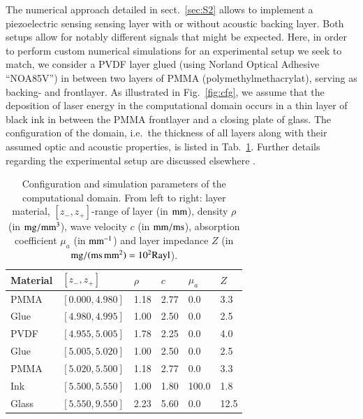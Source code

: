 \documentclass[5p,times,twocolumn]{elsarticle}
\begin{document}
The numerical approach detailed in sect.\ \ref{sec:S2} allows to implement a
piezoelectric sensing sensing layer with or without acoustic backing layer.
Both setups allow for notably different signals that might be expected.  Here,
in order to perform custom numerical simulations for an experimental setup we
seek to match, we consider a PVDF layer glued (using Norland Optical Adhesive
``NOA85V'') in between two layers of PMMA (polymethylmethacrylat), serving as
backing- and frontlayer.  As illustrated in Fig.\ \ref{fig:cfg}, we assume that
the deposition of laser energy in the computational domain occurs in a thin
layer of black ink in between the PMMA frontlayer and a closing plate of glass.
The configuration of the domain, i.e.\ the thickness of all layers along with
their assumed optic and acoustic properties, is listed in Tab.\
\ref{tab:simPars}.  Further details regarding the experimental setup are
discussed elsewhere \cite{Blumenroether:2017}.

\begin{table}[b!]
\caption{\label{tab:simPars} 
Configuration and simulation parameters of the computational domain. From left
to right: layer material, $[z_{-},z_{+}]$-range of layer (in ${\rm{mm}}$),
density $\rho$ (in ${\rm{mg/mm^{3}}}$), wave velocity $c$ (in ${\rm{mm/ms}}$),
absorption coefficient $\mu_a$ (in ${\rm{mm}^{-1}}$) and layer impedance $Z$
(in ${\rm{mg/(ms\, mm^{2})}}=10^2 {\rm{Rayl}}$).
}
\begin{tabular}[c]{llllll}
\hline
Material & $[z_{-},z_{+}]$ & $\rho$   & $c$ & $\mu_a$ & $Z$  \\
\hline \hline 
PMMA  & $[0.000, 4.980]$ & 1.18 & 2.77 & 0.0   & 3.3   \\
Glue  & $[4.980, 4.995]$ & 1.00 & 2.50 & 0.0   & 2.5    \\
PVDF  & $[4.955, 5.005]$ & 1.78 & 2.25 & 0.0   & 4.0    \\
Glue  & $[5.005, 5.020]$ & 1.00 & 2.50 & 0.0   & 2.5    \\
PMMA  & $[5.020, 5.500]$ & 1.18 & 2.77 & 0.0   & 3.3    \\
Ink   & $[5.500, 5.550]$ & 1.00 & 1.80 & 100.0 & 1.8    \\
Glass & $[5.550, 9.550]$ & 2.23 & 5.60 & 0.0   & 12.5   \\
\hline
\end{tabular}
\end{table}
\end{document}
